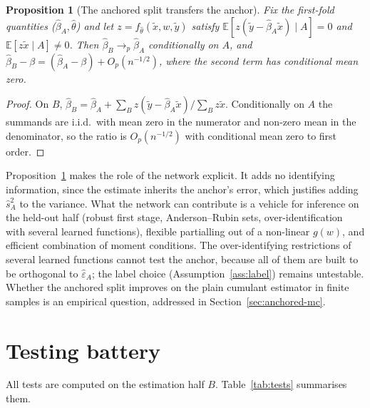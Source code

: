 \documentclass[11pt]{article}
\newtheorem{proposition}{Proposition}
\theoremstyle{definition}
\theoremstyle{remark}
\newcommand{\E}{\mathbb{E}}
\newcommand{\tx}{\tilde{x}}
\newcommand{\ty}{\tilde{y}}
\begin{document}
\begin{proposition}[The anchored split transfers the anchor]\label{prop:anchor}
Fix the first-fold quantities ($\hat\beta_A,\hat\theta$) and let $z=f_{\hat\theta}(\tx,w,\ty)$ satisfy
$\E[z(\ty-\hat\beta_A\tx)\mid A]=0$ and $\E[z\tx\mid A]\neq0$. Then
$\hat\beta_B\to_p\hat\beta_A$ conditionally on $A$, and
$\hat\beta_B-\beta=(\hat\beta_A-\beta)+O_p(n^{-1/2})$, where the second term has conditional mean zero.
\end{proposition}

\begin{proof}
On $B$, $\hat\beta_B=\hat\beta_A+\sum_B z(\ty-\hat\beta_A\tx)/\sum_B z\tx$. Conditionally on $A$ the
summands are i.i.d.\ with mean zero in the numerator and non-zero mean in the denominator, so the
ratio is $O_p(n^{-1/2})$ with conditional mean zero to first order.
\end{proof}

Proposition~\ref{prop:anchor} makes the role of the network explicit. It adds no identifying
information, since the estimate inherits the anchor's error, which justifies adding $\hat s_A^2$ to the
variance. What the network can contribute is a vehicle for inference on the held-out half (robust
first stage, Anderson--Rubin sets, over-identification with several learned functions), flexible
partialling out of a non-linear $g(w)$, and efficient combination of moment conditions. The
over-identifying restrictions of several learned functions cannot test the anchor, because all of
them are built to be orthogonal to $\hat\varepsilon_A$; the label choice
(Assumption~\ref{ass:label}) remains untestable. Whether the anchored split improves on the plain
cumulant estimator in finite samples is an empirical question, addressed in
Section~\ref{sec:anchored-mc}.

\section{Testing battery}\label{sec:tests}

All tests are computed on the estimation half $B$. Table~\ref{tab:tests} summarises them.
\end{document}
